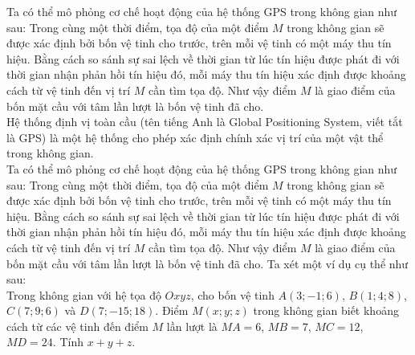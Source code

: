 \begin{vd}[CD]
{
	}
	Ta có thể mô phỏng cơ chế hoạt động của hệ thống GPS trong không gian như sau: Trong cùng một thời điểm, tọa độ của một điểm $M$ trong không gian sẽ được xác định bởi bốn vệ tinh cho trước, trên mỗi vệ tinh có một máy thu tín hiệu. Bằng cách so sánh sự sai lệch về thời gian từ lúc tín hiệu được phát đi với thời gian nhận phản hồi tín hiệu đó, mỗi máy thu tín hiệu xác định được khoảng cách từ vệ tinh đến vị trí $M$ cần tìm tọa độ. Như vậy điểm $M$ là giao điểm của bốn mặt cầu với tâm lần lượt là bốn vệ tinh đã cho.	\\
	Hệ thống định vị toàn cầu (tên tiếng Anh là Global Positioning System, viết tắt là GPS) là một hệ thống cho phép xác định chính xác vị trí của một vật thể trong không gian.\\
	Ta có thể mô phỏng cơ chế hoạt động của hệ thống GPS trong không gian như sau: Trong cùng một thời điểm, tọa độ của một điểm $M$ trong không gian sẽ được xác định bởi bốn vệ tinh cho trước, trên mỗi vệ tinh có một máy thu tín hiệu. Bằng cách so sánh sự sai lệch về thời gian từ lúc tín hiệu được phát đi với thời gian nhận phản hồi tín hiệu đó, mỗi máy thu tín hiệu xác định được khoảng cách từ vệ tinh đến vị trí $M$ cần tìm tọa độ. Như vậy điểm $M$ là giao điểm của bốn mặt cầu với tâm lần lượt là bốn vệ tinh đã cho.	
	Ta xét một ví dụ cụ thể như sau$\colon$\\
	Trong không gian với hệ tọa độ $Oxyz$, cho bốn vệ tinh $A(3;-1;6)$, $B(1;4;8)$, $C(7;9;6)$ và $D(7;-15;18)$. Điểm $M(x;y;z)$ trong không gian biết khoảng cách từ các vệ tinh đến điểm $M$ lần lượt là $MA=6$, $MB=7$, $MC=12$, $MD=24$. Tính $x+y+z$.
\end{vd}

